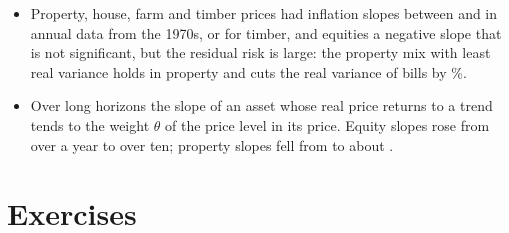 \begin{chapterrefs}
\begin{itemize}
        correlation of \sgCorrOil. The owner of storage can lock in an available spread with futures and keeps the option
        to revise the plan if the curve moves in its favour, an option whose value depends on how prices move
        and on the facility's limits; the August monthly average gas futures imply a September to
        December log spread of \sgLockMean\% on average, against a spot spread of \sgRealMean\% with a volatility of \sgRealSd\%.
  \item Property, house, farm and timber prices had inflation slopes between \ihBHpi{} and \ihBFarm{} in
        annual data from the 1970s, or \ihStartTimber{} for timber, and equities a negative slope that is not significant, but the residual risk is large: the property mix with least real variance holds
        \ihWcre{} in property and cuts the real variance of bills by \ihVarCut\%.
  \item Over long horizons the slope of an asset whose real price returns to a trend tends to the
        weight $\theta$ of the price level in its price. Equity slopes rose from \ihBMkt{} over a year to
        \ihHMktTen{} over ten; property slopes fell from \ihBCre{} to about \ihHCreTen.
\end{itemize}

\FloatBarrier
\section{Exercises}
\label{sec10:exercises}


\end{chapterrefs}
